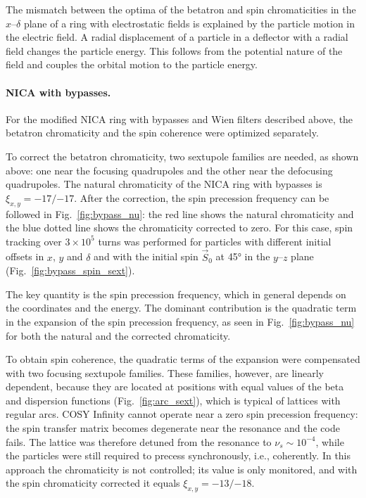 \documentclass[%
  aps,
  pra,
  preprint,
  a4paper,
  amsmath,
  amssymb,
  floatfix,
  longbibliography,
  superscriptaddress
]{revtex4-2}
\begin{document}
The mismatch between the optima of the betatron and spin chromaticities in the
$x$--$\delta$ plane of a ring with electrostatic fields is explained by the
particle motion in the electric field. A radial displacement of a particle in
a deflector with a radial field changes the particle energy. This follows from
the potential nature of the field and couples the orbital motion to the
particle energy.

\paragraph{NICA with bypasses.}
For the modified NICA ring with bypasses and Wien filters described above, the
betatron chromaticity and the spin coherence were optimized separately.

To correct the betatron chromaticity, two sextupole families are needed, as
shown above: one near the focusing quadrupoles and the other near the
defocusing quadrupoles. The natural chromaticity of the NICA ring with
bypasses is $\xi_{x,y} = -17/{-17}$. After the correction, the spin precession
frequency can be followed in Fig.~\ref{fig:bypass_nu}: the red line shows the
natural chromaticity and the blue dotted line shows the chromaticity corrected
to zero. For this case, spin tracking over $3\times10^5$ turns was performed
for particles with different initial offsets in $x$, $y$ and $\delta$ and with
the initial spin $\vec{S}_0$ at \ang{45} in the $y$--$z$ plane
(Fig.~\ref{fig:bypass_spin_sext}).

The key quantity is the spin precession frequency, which in general depends on
the coordinates and the energy. The dominant contribution is the quadratic
term in the expansion of the spin precession frequency, as seen in
Fig.~\ref{fig:bypass_nu} for both the natural and the corrected
chromaticity.

To obtain spin coherence, the quadratic terms of the expansion were
compensated with two focusing sextupole families. These families, however,
are linearly dependent, because they are located at positions with equal
values of the beta and dispersion functions (Fig.~\ref{fig:arc_sext}), which
is typical of lattices with regular arcs. COSY Infinity cannot operate near a
zero spin precession frequency: the spin transfer matrix becomes degenerate
near the resonance and the code fails. The lattice was therefore detuned from
the resonance to $\nu_s\sim10^{-4}$, while the particles were still required to
precess synchronously, i.e., coherently. In this approach the chromaticity is
not controlled; its value is only monitored, and with the spin chromaticity
corrected it equals $\xi_{x,y} = -13/{-18}$.
\end{document}
